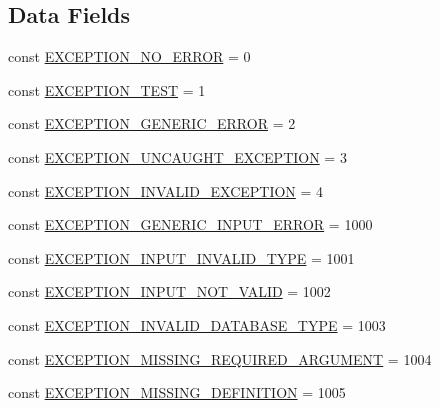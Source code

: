 \subsection*{Data Fields}
\begin{DoxyCompactItemize}
\item 
const \hyperlink{class_database_exception_a93f610f377641d6a80dc3ba2c0d282cd}{E\+X\+C\+E\+P\+T\+I\+O\+N\+\_\+\+N\+O\+\_\+\+E\+R\+R\+O\+R} = 0
\item 
const \hyperlink{class_database_exception_ad70fde01b9fdf6cab7de36cb7f2329dd}{E\+X\+C\+E\+P\+T\+I\+O\+N\+\_\+\+T\+E\+S\+T} = 1
\item 
const \hyperlink{class_database_exception_a1531374c43d8490500ae0220d0b4a45a}{E\+X\+C\+E\+P\+T\+I\+O\+N\+\_\+\+G\+E\+N\+E\+R\+I\+C\+\_\+\+E\+R\+R\+O\+R} = 2
\item 
const \hyperlink{class_database_exception_aa329d5b77c2ad7a40e283926c6c6dc2e}{E\+X\+C\+E\+P\+T\+I\+O\+N\+\_\+\+U\+N\+C\+A\+U\+G\+H\+T\+\_\+\+E\+X\+C\+E\+P\+T\+I\+O\+N} = 3
\item 
const \hyperlink{class_database_exception_a9214bdd72834d71914a74f0a27db4a1e}{E\+X\+C\+E\+P\+T\+I\+O\+N\+\_\+\+I\+N\+V\+A\+L\+I\+D\+\_\+\+E\+X\+C\+E\+P\+T\+I\+O\+N} = 4
\item 
const \hyperlink{class_database_exception_af16d7ab9f9f71d7ac961a10a2eb9ec65}{E\+X\+C\+E\+P\+T\+I\+O\+N\+\_\+\+G\+E\+N\+E\+R\+I\+C\+\_\+\+I\+N\+P\+U\+T\+\_\+\+E\+R\+R\+O\+R} = 1000
\item 
const \hyperlink{class_database_exception_ab85a8b8e512fdab1e0f3a0ca8be9aaa0}{E\+X\+C\+E\+P\+T\+I\+O\+N\+\_\+\+I\+N\+P\+U\+T\+\_\+\+I\+N\+V\+A\+L\+I\+D\+\_\+\+T\+Y\+P\+E} = 1001
\item 
const \hyperlink{class_database_exception_aecec182787a871e4c5c0a2f4110f9920}{E\+X\+C\+E\+P\+T\+I\+O\+N\+\_\+\+I\+N\+P\+U\+T\+\_\+\+N\+O\+T\+\_\+\+V\+A\+L\+I\+D} = 1002
\item 
const \hyperlink{class_database_exception_a5e32a0f3e8b89279262617564b4c39a2}{E\+X\+C\+E\+P\+T\+I\+O\+N\+\_\+\+I\+N\+V\+A\+L\+I\+D\+\_\+\+D\+A\+T\+A\+B\+A\+S\+E\+\_\+\+T\+Y\+P\+E} = 1003
\item 
const \hyperlink{class_database_exception_a95a9d1ff5c1d06fff7293ea4b61af959}{E\+X\+C\+E\+P\+T\+I\+O\+N\+\_\+\+M\+I\+S\+S\+I\+N\+G\+\_\+\+R\+E\+Q\+U\+I\+R\+E\+D\+\_\+\+A\+R\+G\+U\+M\+E\+N\+T} = 1004
\item 
const \hyperlink{class_database_exception_acb77d344642fcd23d3007350580df264}{E\+X\+C\+E\+P\+T\+I\+O\+N\+\_\+\+M\+I\+S\+S\+I\+N\+G\+\_\+\+D\+E\+F\+I\+N\+I\+T\+I\+O\+N} = 1005

\end{DoxyCompactItemize}
